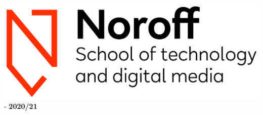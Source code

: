 \includegraphics[width=.4\textwidth,right]{Images/Noroff-logo-H}
\vskip 0pt \vspace{2.5cm}
\Huge
\textbf{\tutname}\\

\LARGE \textbf{\coursename} - \textbf{2020/21}
\vskip 0pt \vspace{10mm}
\large{\version}
\vspace{0.5cm}
\color{red}
\pline %
\color{black}